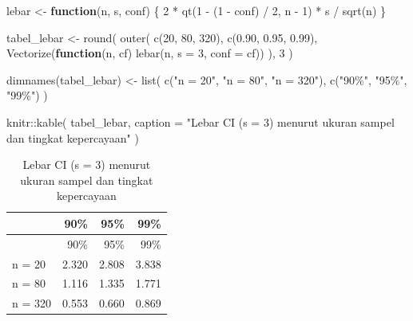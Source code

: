 \documentclass[
  indonesian,
  letterpaper,
]{book}
\newenvironment{Shaded}{\begin{snugshade}}{\end{snugshade}}
\newcommand{\AttributeTok}[1]{\textcolor[rgb]{0.40,0.45,0.13}{#1}}
\newcommand{\ControlFlowTok}[1]{\textcolor[rgb]{0.00,0.23,0.31}{\textbf{#1}}}
\newcommand{\DecValTok}[1]{\textcolor[rgb]{0.68,0.00,0.00}{#1}}
\newcommand{\FloatTok}[1]{\textcolor[rgb]{0.68,0.00,0.00}{#1}}
\newcommand{\FunctionTok}[1]{\textcolor[rgb]{0.28,0.35,0.67}{#1}}
\newcommand{\NormalTok}[1]{\textcolor[rgb]{0.00,0.23,0.31}{#1}}
\newcommand{\OtherTok}[1]{\textcolor[rgb]{0.00,0.23,0.31}{#1}}
\newcommand{\SpecialCharTok}[1]{\textcolor[rgb]{0.37,0.37,0.37}{#1}}
\newcommand{\StringTok}[1]{\textcolor[rgb]{0.13,0.47,0.30}{#1}}
\begin{document}
\begin{Shaded}
\begin{Highlighting}[]
\NormalTok{lebar }\OtherTok{\textless{}{-}} \ControlFlowTok{function}\NormalTok{(n, s, conf) \{}
  \DecValTok{2} \SpecialCharTok{*} \FunctionTok{qt}\NormalTok{(}\DecValTok{1} \SpecialCharTok{{-}}\NormalTok{ (}\DecValTok{1} \SpecialCharTok{{-}}\NormalTok{ conf) }\SpecialCharTok{/} \DecValTok{2}\NormalTok{, n }\SpecialCharTok{{-}} \DecValTok{1}\NormalTok{) }\SpecialCharTok{*}\NormalTok{ s }\SpecialCharTok{/} \FunctionTok{sqrt}\NormalTok{(n)}
\NormalTok{\}}

\NormalTok{tabel\_lebar }\OtherTok{\textless{}{-}} \FunctionTok{round}\NormalTok{(}
  \FunctionTok{outer}\NormalTok{(}
    \FunctionTok{c}\NormalTok{(}\DecValTok{20}\NormalTok{, }\DecValTok{80}\NormalTok{, }\DecValTok{320}\NormalTok{),}
    \FunctionTok{c}\NormalTok{(}\FloatTok{0.90}\NormalTok{, }\FloatTok{0.95}\NormalTok{, }\FloatTok{0.99}\NormalTok{),}
    \FunctionTok{Vectorize}\NormalTok{(}\ControlFlowTok{function}\NormalTok{(n, cf) }\FunctionTok{lebar}\NormalTok{(n, }\AttributeTok{s =} \DecValTok{3}\NormalTok{, }\AttributeTok{conf =}\NormalTok{ cf))}
\NormalTok{  ),}
  \DecValTok{3}
\NormalTok{)}

\FunctionTok{dimnames}\NormalTok{(tabel\_lebar) }\OtherTok{\textless{}{-}} \FunctionTok{list}\NormalTok{(}
  \FunctionTok{c}\NormalTok{(}\StringTok{"n = 20"}\NormalTok{, }\StringTok{"n = 80"}\NormalTok{, }\StringTok{"n = 320"}\NormalTok{),}
  \FunctionTok{c}\NormalTok{(}\StringTok{"90\%"}\NormalTok{, }\StringTok{"95\%"}\NormalTok{, }\StringTok{"99\%"}\NormalTok{)}
\NormalTok{)}

\NormalTok{knitr}\SpecialCharTok{::}\FunctionTok{kable}\NormalTok{(}
\NormalTok{  tabel\_lebar,}
  \AttributeTok{caption =} \StringTok{"Lebar CI (s = 3) menurut ukuran sampel dan tingkat kepercayaan"}
\NormalTok{)}
\end{Highlighting}
\end{Shaded}

\begin{longtable}[]{@{}lrrr@{}}
\caption{Lebar CI (s = 3) menurut ukuran sampel dan tingkat
kepercayaan}\tabularnewline
\toprule\noalign{}
& 90\% & 95\% & 99\% \\
\midrule\noalign{}
\endfirsthead
\toprule\noalign{}
& 90\% & 95\% & 99\% \\
\midrule\noalign{}
\endhead
\bottomrule\noalign{}
\endlastfoot
n = 20 & 2.320 & 2.808 & 3.838 \\
n = 80 & 1.116 & 1.335 & 1.771 \\
n = 320 & 0.553 & 0.660 & 0.869 \\
\end{longtable}
\end{document}
